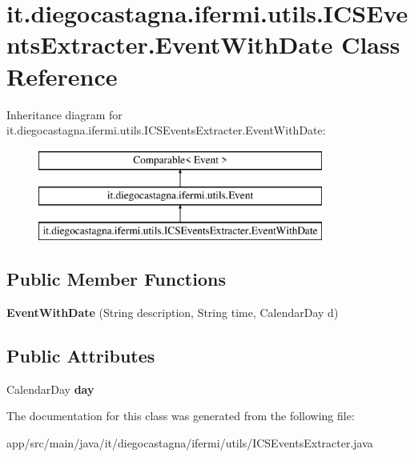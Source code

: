 \hypertarget{classit_1_1diegocastagna_1_1ifermi_1_1utils_1_1_i_c_s_events_extracter_1_1_event_with_date}{}\section{it.\+diegocastagna.\+ifermi.\+utils.\+I\+C\+S\+Events\+Extracter.\+Event\+With\+Date Class Reference}
\label{classit_1_1diegocastagna_1_1ifermi_1_1utils_1_1_i_c_s_events_extracter_1_1_event_with_date}
Inheritance diagram for it.\+diegocastagna.\+ifermi.\+utils.\+I\+C\+S\+Events\+Extracter.\+Event\+With\+Date\+:\begin{figure}[H]
\begin{center}
\leavevmode
\includegraphics[height=3.000000cm]{classit_1_1diegocastagna_1_1ifermi_1_1utils_1_1_i_c_s_events_extracter_1_1_event_with_date}
\end{center}
\end{figure}
\subsection*{Public Member Functions}
\begin{DoxyCompactItemize}
\item 
\mbox{\label{classit_1_1diegocastagna_1_1ifermi_1_1utils_1_1_i_c_s_events_extracter_1_1_event_with_date_a7356e21602b080f3eb5a24fe7df13c4d}} 
{\bfseries Event\+With\+Date} (String description, String time, Calendar\+Day d)
\end{DoxyCompactItemize}
\subsection*{Public Attributes}
\begin{DoxyCompactItemize}
\item 
\mbox{\label{classit_1_1diegocastagna_1_1ifermi_1_1utils_1_1_i_c_s_events_extracter_1_1_event_with_date_a1f45c83c3f0e66bf99fa6bd5fc773628}} 
Calendar\+Day {\bfseries day}
\end{DoxyCompactItemize}


The documentation for this class was generated from the following file\+:\begin{DoxyCompactItemize}
\item 
app/src/main/java/it/diegocastagna/ifermi/utils/I\+C\+S\+Events\+Extracter.\+java\end{DoxyCompactItemize}
